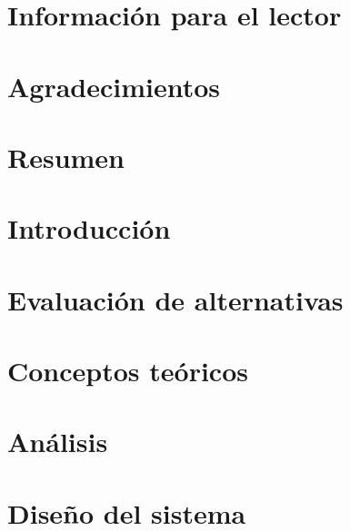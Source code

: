\documentclass{report}
\begin{document}


\newpage
\thispagestyle{plain}
\mbox{}

\chapter*{Información para el lector}
\label{informacion_lector}


\newpage
\thispagestyle{plain}
\mbox{}

\chapter*{Agradecimientos}
\label{agradecimientos}


\newpage
\thispagestyle{plain}
\mbox{}

\chapter*{Resumen}
\label{resumen}


\newpage
\thispagestyle{plain}
\mbox{}

\tableofcontents

\listoffigures

\listoftables

\chapter{Introducción}
\label{chapter01}


\chapter{Evaluación de alternativas}
\label{chapter02}


\chapter{Conceptos teóricos}
\label{chapter03}


\chapter{Análisis}
\label{chapter04}


\chapter{Diseño del sistema}
\label{chapter05}

\end{document}
